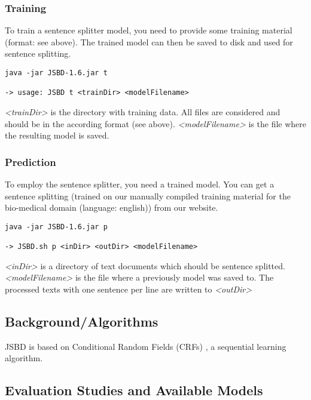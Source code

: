 \documentclass[11pt,a4paper,halfparskip]{scrartcl}
\begin{document}
\subsubsection{Training}

To train a sentence splitter model, you need to provide some training
material (format: see above). The trained model can then be saved to
disk and used for sentence splitting.

\begin{verbatim}
java -jar JSBD-1.6.jar t

-> usage: JSBD t <trainDir> <modelFilename>
\end{verbatim}

\textit{<trainDir>} is the directory with training data. All files are
considered and should be in the according format (see above).
\textit{<modelFilename>} is the file where the resulting model is
saved.

\subsubsection{Prediction}

To employ the sentence splitter, you need a trained model. You can get
a sentence splitting (trained on our manually compiled training
material for the bio-medical domain (language: english)) from our
website.


\begin{verbatim}
java -jar JSBD-1.6.jar p

-> JSBD.sh p <inDir> <outDir> <modelFilename>
\end{verbatim}

\textit{<inDir>} is a directory of text documents which should be
sentence splitted. \textit{<modelFilename>} is the file where a
previously model was saved to. The processed texts with one sentence
per line are written to \textit{<outDir>}

\subsection{Background/Algorithms}
\label{sec:background}

JSBD is based on Conditional Random Fields (CRFs) \cite{lafferty01}, a
sequential learning algorithm. 

\subsection{Evaluation Studies and Available Models}
\end{document}
